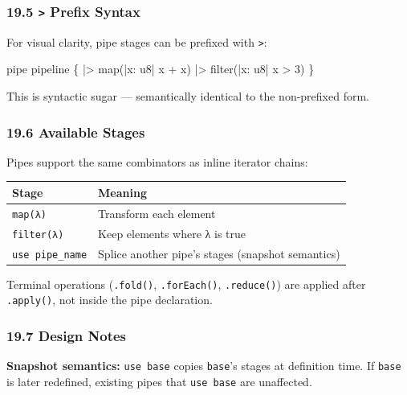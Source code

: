 \documentclass[
  11pt,
]{article}
\newenvironment{Shaded}{\begin{snugshade}}{\end{snugshade}}
\newcommand{\NormalTok}[1]{#1}
\begin{document}
\hypertarget{prefix-syntax}{%
\subsubsection{\texorpdfstring{19.5 \texttt{\textbar{}\textgreater{}}
Prefix
Syntax}{19.5 \textbar\textgreater{} Prefix Syntax}}\label{prefix-syntax}}

For visual clarity, pipe stages can be prefixed with
\texttt{\textbar{}\textgreater{}}:

\begin{Shaded}
\begin{Highlighting}[]
\NormalTok{pipe pipeline \{}
\NormalTok{    |\textgreater{} map(|x: u8| x + x)}
\NormalTok{    |\textgreater{} filter(|x: u8| x \textgreater{} 3)}
\NormalTok{\}}
\end{Highlighting}
\end{Shaded}

This is syntactic sugar --- semantically identical to the non-prefixed
form.

\hypertarget{available-stages}{%
\subsubsection{19.6 Available Stages}\label{available-stages}}

Pipes support the same combinators as inline iterator chains:

\begin{longtable}[]{@{}ll@{}}
\toprule\noalign{}
Stage & Meaning \\
\midrule\noalign{}
\endhead
\bottomrule\noalign{}
\endlastfoot
\texttt{map(λ)} & Transform each element \\
\texttt{filter(λ)} & Keep elements where λ is true \\
\texttt{use\ pipe\_name} & Splice another pipe's stages (snapshot
semantics) \\
\end{longtable}

Terminal operations (\texttt{.fold()}, \texttt{.forEach()},
\texttt{.reduce()}) are applied after \texttt{.apply()}, not inside the
pipe declaration.

\hypertarget{design-notes}{%
\subsubsection{19.7 Design Notes}\label{design-notes}}

\textbf{Snapshot semantics:} \texttt{use\ base} copies \texttt{base}'s
stages at definition time. If \texttt{base} is later redefined, existing
pipes that \texttt{use\ base} are unaffected.
\end{document}

